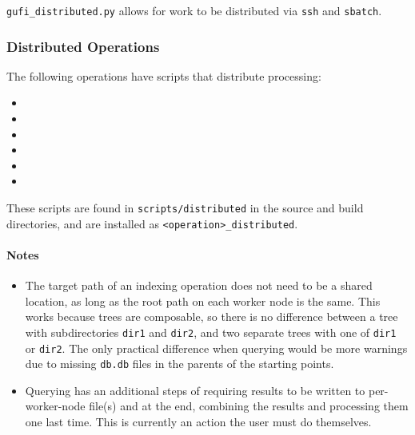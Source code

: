\texttt{gufi\_distributed.py} allows for work to be distributed via
\texttt{ssh} and \texttt{sbatch}.

\subsubsection{Distributed Operations}
The following operations have scripts that distribute processing:

\begin{itemize}
\item \gufidirindex
\item \gufidirtrace
\item \gufitreesummaryall
\item \gufirollup
\item \gufiunrollup
\item \gufiquery
\end{itemize}

These scripts are found in \texttt{scripts/distributed} in the source
and build directories, and are installed as
\texttt{<operation>\_distributed}.

\paragraph{Notes}
\begin{itemize}
\item The target path of an indexing operation does not need to be a
  shared location, as long as the root path on each worker node is the
  same. This works because trees are composable, so there is no
  difference between a tree with subdirectories \texttt{dir1} and
  \texttt{dir2}, and two separate trees with one of \texttt{dir1} or
  \texttt{dir2}. The only practical difference when querying would be
  more warnings due to missing \texttt{db.db} files in the parents of
  the starting points.
\item Querying has an additional steps of requiring results to be
  written to per-worker-node file(s) and at the end, combining the
  results and processing them one last time. This is currently an
  action the user must do themselves.
\end{itemize}
